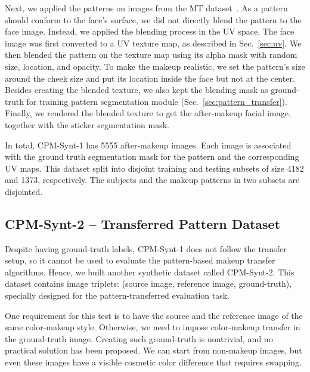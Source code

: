 \documentclass[final]{cvpr}
\begin{document}
Next, we applied the patterns on images from the MT dataset~\cite{beautygan}. As a pattern should conform to the face's surface, we did not directly blend the pattern to the face image. Instead, we applied the blending process in the UV space. The face image was first converted to a UV texture map, as described in Sec.~\ref{sec:uv}. We then blended the pattern on the texture map using its alpha mask with random size, location, and opacity. To make the makeup realistic, we set the pattern's size around the cheek size and put its location inside the face but not at the center. Besides creating the blended texture, we also kept the blending mask as ground-truth for training pattern segmentation module (Sec.~\ref{sec:pattern_transfer}). Finally, we rendered the blended texture to get the after-makeup facial image, together with the sticker segmentation mask. 








In total, CPM-Synt-1 has 5555 after-makeup images. Each image is associated with the ground truth segmentation mask for the pattern and the corresponding UV maps. This dataset split into disjoint training and testing subsets of size 4182 and 1373, respectively. The subjects and the makeup patterns in two subsets are disjointed. 


\subsection{CPM-Synt-2 -- Transferred Pattern Dataset}
\vspace{-1mm}






Despite having ground-truth labels, CPM-Synt-1 does not follow the transfer setup, so it cannot be used to evaluate the pattern-based makeup transfer algorithms. Hence, we built another synthetic dataset called CPM-Synt-2. This dataset contains image triplets: (source image, reference image, ground-truth), specially designed for the pattern-transferred evaluation task. 

One requirement for this test is to have the source and the reference image of the same color-makeup style. Otherwise, we need to impose color-makeup transfer in the ground-truth image. Creating such ground-truth is nontrivial, and no practical solution has been proposed. We can start from non-makeup images, but even these images have a visible cosmetic color difference that requires swapping.
\end{document}
